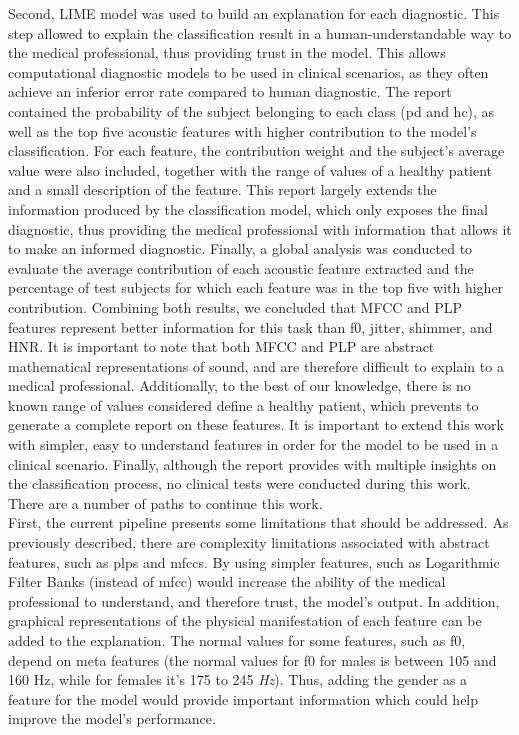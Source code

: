 Second, LIME model was used to build an explanation for each diagnostic. This step allowed to explain the classification result in a human-understandable way to the medical professional, thus providing trust in the model. This allows computational diagnostic models to be used in clinical scenarios, as they often achieve an inferior error rate compared to human diagnostic. The report contained the probability of the subject belonging to each class (\gls{pd} and \gls{hc}), as well as the top five acoustic features with higher contribution to the model's classification. For each feature, the contribution weight and the subject's average value were also included, together with the range of values of a healthy patient and a small description of the feature. This report largely extends the information produced by the classification model, which only exposes the final diagnostic, thus providing the medical professional with information that allows it to make an informed diagnostic. Finally, a global analysis was conducted to evaluate the average contribution of each acoustic feature extracted and the percentage of test subjects for which each feature was in the top five with higher contribution. Combining both results, we concluded that MFCC and PLP features represent better information for this task than \gls{f0}, jitter, shimmer, and HNR.
It is important to note that both MFCC and PLP are abstract mathematical representations of sound, and are therefore difficult to explain to a medical professional. Additionally, to the best of our knowledge, there is no known range of values considered define a healthy patient, which prevents to generate a complete report on these features. It is important to extend this work with simpler, easy to understand features in order for the model to be used in a clinical scenario. Finally, although the report provides with multiple insights on the classification process, no clinical tests were conducted during this work. \\
There are a number of paths to continue this work. \\
First, the current pipeline presents some limitations that should be addressed. As previously described, there are complexity limitations associated with abstract features, such as \gls{plp}s and \gls{mfcc}s. By using simpler features, such as Logarithmic Filter Banks (instead of \gls{mfcc}) would increase the ability of the medical professional to understand, and therefore trust, the model's output. In addition, graphical representations of the physical manifestation of each feature can be added to the explanation. The normal values for some features, such as \gls{f0}, depend on meta features (the normal values for \gls{f0} for males is between 105 and 160 Hz, while for females it's 175 to 245 \textit{Hz}). Thus, adding the gender as a feature for the model would provide important information which could help improve the model's performance. \\
